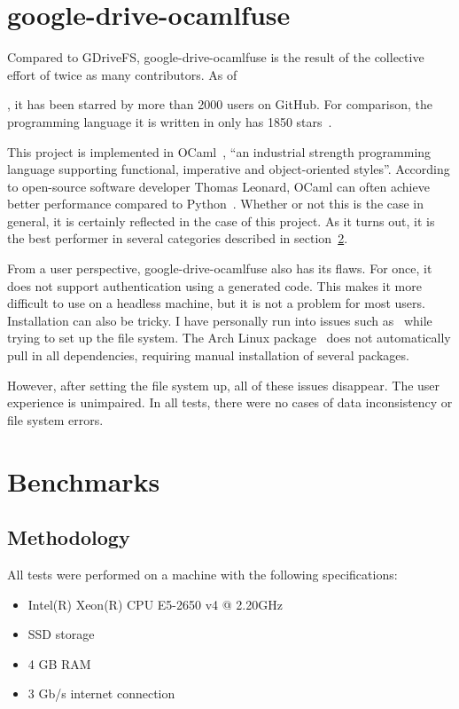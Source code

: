 \section{google-drive-ocamlfuse}

Compared to GDriveFS, google-drive-ocamlfuse is the result of the collective effort of twice as many contributors. As of \date{June 2018}, it has been starred by more than 2000 users on GitHub. For comparison, the programming language it is written in only has 1850 stars~\cite{ocaml}.

This project is implemented in OCaml~\cite{ocaml-website}, ``an industrial strength programming language supporting functional, imperative and object-oriented styles''. According to open-source software developer Thomas Leonard, OCaml can often achieve better performance compared to Python~\cite{python_to_ocaml_retrospective}. Whether or not this is the case in general, it is certainly reflected in the case of this project. As it turns out, it is the best performer in several categories described in section~\ref{benchmarks}.

From a user perspective, google-drive-ocamlfuse also has its flaws. For once, it does not support authentication using a generated code. This makes it more difficult to use on a headless machine, but it is not a problem for most users. Installation can also be tricky. I have personally run into issues such as~\cite{opam-depext-issue} while trying to set up the file system. The Arch Linux package~\cite{google-drive-ocamlfuse-aur} does not automatically pull in all dependencies, requiring manual installation of several packages.

However, after setting the file system up, all of these issues disappear. The user experience is unimpaired. In all tests, there were no cases of data inconsistency or file system errors.

\section{Benchmarks} \label{benchmarks}

\subsection{Methodology}

All tests were performed on a machine with the following specifications:

\begin{itemize}
  \setlength\itemsep{-0.4em}
  \item Intel(R) Xeon(R) CPU E5-2650 v4 @ 2.20GHz
  \item SSD storage
  \item 4 GB RAM
  \item 3 Gb/s internet connection
\end{itemize}

